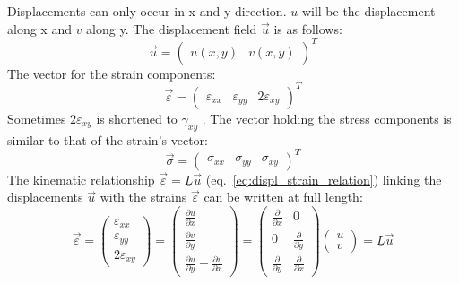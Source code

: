   Displacements can only occur in x and y direction. $u$ will be the displacement along x and $v$ along y. The displacement field $\vec{u}$ is as follows:
  \begin{equation}
  \vec{u}=\begin{pmatrix}
  u(x,y) & v(x,y)
  \end{pmatrix}^T
  \end{equation}
  The vector for the strain components:
  \begin{equation}
  \vec{\varepsilon}=\begin{pmatrix}
  \varepsilon_{xx} & \varepsilon_{yy} & 2\varepsilon_{xy}
  \end{pmatrix}^T
  \end{equation}
  Sometimes $2\varepsilon_{xy}$ is shortened to $\gamma_{xy}$ \cite{steinke2005finite}.
  The vector holding the stress components is similar to that of the strain's vector:
  \begin{equation}
  \vec{\sigma}=\begin{pmatrix}
  \sigma_{xx} & \sigma_{yy} & \sigma_{xy}
  \end{pmatrix}^T
  \end{equation}
  The kinematic relationship $\vec{\varepsilon}=\underline{L}\vec{u}$ (eq.\ \eqref{eq:displ_strain_relation}) linking the displacements $\vec{u}$ with the strains $\vec{\varepsilon}$ can be written at full length:
  \begin{equation}\label{eq:t3displ-str-rel}
  \vec{\varepsilon} = \begin{pmatrix}
  \varepsilon_{xx} \\
  \varepsilon_{yy} \\
  2\varepsilon_{xy}
  \end{pmatrix} =
  \begin{pmatrix}
  \frac{\partial u}{\partial x} \\
  \frac{\partial v}{\partial y} \\
  \frac{\partial u}{\partial y} + \frac{\partial v}{\partial x}
  \end{pmatrix} =
  \begin{pmatrix}
  \frac{\partial}{\partial x} & 0 \\
  0 & \frac{\partial}{\partial y} \\
  \frac{\partial}{\partial y} & \frac{\partial}{\partial x}
  \end{pmatrix}
  \begin{pmatrix}
  u \\
  v
  \end{pmatrix}
  = \underline{L} \vec{u}
  \end{equation}

